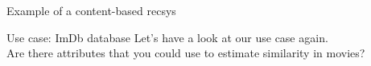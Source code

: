 \documentclass[handout]{beamer}
\begin{document}
\begin{frame}{Example of a content-based recsys}
\end{frame}





\begin{frame}{Use case: ImDb database}
	Let's have a look at our use case again. \\
	Are there attributes that you could use to estimate similarity in movies?
\end{frame}
\end{document}
